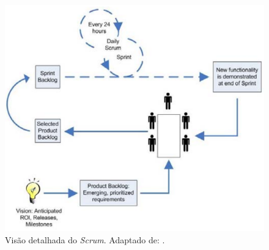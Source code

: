\begin{figure}[!htb]
	\centering
		\includegraphics[scale=0.7]{figuras/scrum_detalhado}
	\caption{Visão detalhada do \textit{Scrum}. Adaptado de: \cite{scrum2005}.}
\end{figure}
\clearpage

